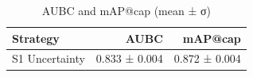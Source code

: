 \begin{table}[t]
\centering
\caption{AUBC and mAP@cap (mean ± σ)}
\label{tbl:aubc}
\begin{tabular}{lrr}
\toprule
Strategy & AUBC & mAP@cap \\
\midrule
S1 Uncertainty & 0.833 ± 0.004 & 0.872 ± 0.004 \\
\bottomrule
\end{tabular}
\end{table}
